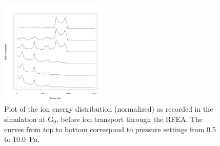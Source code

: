 \begin{figure}[htbp]
\centering
\includegraphics[width=0.45\textwidth]{Figures/IEDFatG0.jpeg}
\caption{Plot of the ion energy distribution (normalized) as recorded in the simulation at G$_0$, before ion transport through the RFEA. The curves from top to bottom correspond to pressure settings from 0.5 to 10.0~Pa.}
\label{fig:IEDFatG0}
\end{figure}
 
